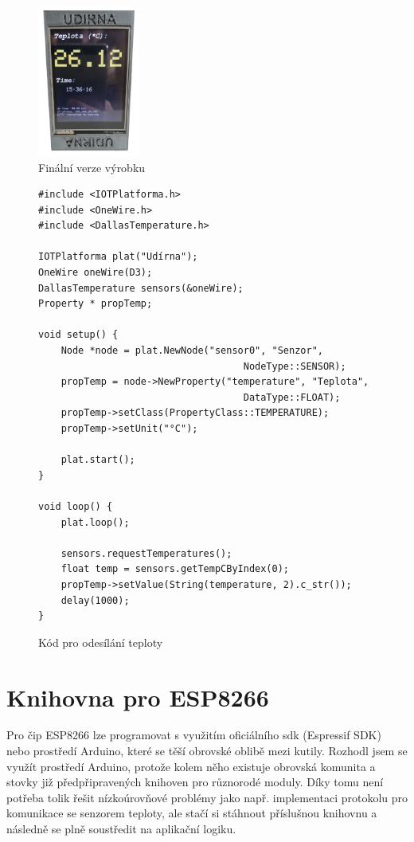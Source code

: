 \begin{figure}[htbp]
    \centering
    \includegraphics[width=0.3\textwidth]{img/smokehouse.png}
    \caption{\label{smokehouse}Finální verze výrobku}
\end{figure}

\begin{figure}[h!tb]
    \begin{verbatim}
#include <IOTPlatforma.h>
#include <OneWire.h>
#include <DallasTemperature.h>

IOTPlatforma plat("Udírna");
OneWire oneWire(D3);
DallasTemperature sensors(&oneWire);
Property * propTemp;

void setup() {
    Node *node = plat.NewNode("sensor0", "Senzor", 
                                    NodeType::SENSOR);
    propTemp = node->NewProperty("temperature", "Teplota", 
                                    DataType::FLOAT);
    propTemp->setClass(PropertyClass::TEMPERATURE);
    propTemp->setUnit("°C");

    plat.start();
}

void loop() {
    plat.loop();

    sensors.requestTemperatures();
    float temp = sensors.getTempCByIndex(0);
    propTemp->setValue(String(temperature, 2).c_str());
    delay(1000);
}
\end{verbatim}
    \caption{\label{code}Kód pro odesílání teploty}
\end{figure}

\section{Knihovna pro ESP8266}
\label{library}
Pro čip ESP8266 lze programovat s využitím oficiálního sdk (Espressif SDK) nebo prostředí Arduino, které se těší obrovské oblibě mezi kutily. Rozhodl jsem se využít prostředí Arduino, protože kolem něho existuje obrovská komunita a stovky již předpřipravených knihoven pro různorodé moduly. Díky tomu není potřeba tolik řešit nízkoúrovňové problémy jako např. implementaci protokolu pro komunikace se senzorem teploty, ale stačí si stáhnout příslušnou knihovnu a následně se plně soustředit na aplikační logiku.

